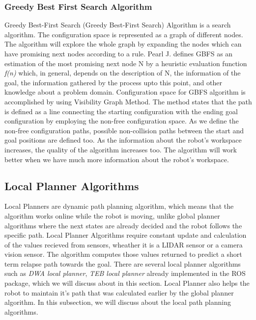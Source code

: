 \subsubsection{Greedy Best First Search Algorithm}
Greedy Best-First Search (Greedy Best-First Search) Algorithm is a search algorithm. The configuration space is represented as a graph of different nodes. 
The algorithm will explore the whole graph by expanding the nodes which can have promising next nodes according to a rule. Pearl J. \cite{pearlJ} defines GBFS
as an estimation of the most promising next node N by a heuristic evaluation function \textit{f(n)} which, in general, depends on the description of N, the information 
of the goal, the information gathered by the process upto this point, and other knowledge about a problem domain.
Configuration space for GBFS algorithm is accomplished by using Visibility Graph Method. The method states that the path is defined as a line connecting the starting
configuration with the ending goal configuration by employing the non-free configuration space. As we define the non-free configuration paths, possible non-collision paths between the start and goal positions are defined too.
As the information about the robot's workspace increases, the quality of the algorithm increases too. The algorithm will work better when we have much more information about the robot's workspace.

\subsection{Local Planner Algorithms}
Local Planners are dynamic path planning algorithm, which means that the algorithm works online while the robot is moving, unlike global planner algorithms where the next states are already decided and the robot follows the specific path. 
Local Planner Algorithms require constant update and calculation of the values recieved from sensors, wheather it is a LIDAR sensor or a camera vision sensor. The algorithm computes those values returned to predict a short term relapse path towards the goal.
There are several local planner algorithms such as \textit{DWA local planner}, \textit{TEB local planner} already implemented in the ROS package, which we will discuss about in this section. Local Planner also helps the robot to maintain it's path that was calculated earlier by the global planner algorithm. 
In this subsection, we will discuss about the local path planning algorithms.

